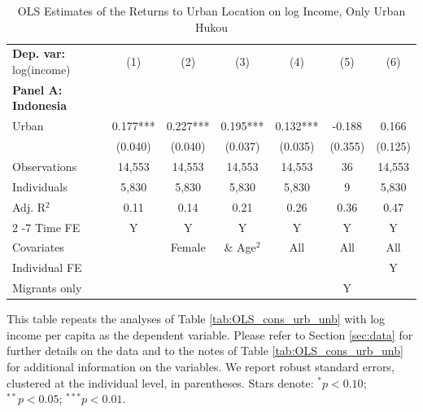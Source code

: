 \begin{table}[htbp] \centering \begin{threeparttable}
 \caption{OLS Estimates of the Returns to Urban Location on log Income, Only Urban Hukou} 
 \label{tab:OLS_CHN_hukou_urban_only_income_urban_unb} 
\begin{tabular}{l cccccc} \toprule  \textbf{Dep. var:}  log(income) 
                    &\multicolumn{1}{c}{(1)}   &\multicolumn{1}{c}{(2)}   &\multicolumn{1}{c}{(3)}   &\multicolumn{1}{c}{(4)}   &\multicolumn{1}{c}{(5)}   &\multicolumn{1}{c}{(6)}   \\
\textbf{Panel A: Indonesia} \\
Urban               &       0.177***&       0.227***&       0.195***&       0.132***&      -0.188   &       0.166   \\
                    &     (0.040)   &     (0.040)   &     (0.037)   &     (0.035)   &     (0.355)   &     (0.125)   \\
\addlinespace
Observations        &      14,553   &      14,553   &      14,553   &      14,553   &          36   &      14,553   \\
Individuals         &       5,830   &       5,830   &       5,830   &       5,830   &           9   &       5,830   \\
Adj. R$^{2}$        &        0.11   &        0.14   &        0.21   &        0.26   &        0.36   &        0.47   \\
\cmidrule{2 -7} Time FE & Y & Y & Y & Y & Y & Y \\ Covariates & & Female & \& Age$^2$ & All & All & All \\ Individual FE & & & & & & Y \\ Migrants only & & & & & Y & \\ \bottomrule \end{tabular} \begin{tablenotes}[flushleft] \footnotesize \item{This table repeats the analyses of Table \ref{tab:OLS_cons_urb_unb} with log income per capita as the dependent variable. Please refer to Section \ref{sec:data} for further details on the data and to the notes of Table \ref{tab:OLS_cons_urb_unb} for additional information on the variables. We report robust standard errors, clustered at the individual level, in parentheses. Stars denote: $^{*} p<0.10$; $^{**} p<0.05$; $^{***} p<0.01$.} \end{tablenotes} \end{threeparttable} \end{table}
